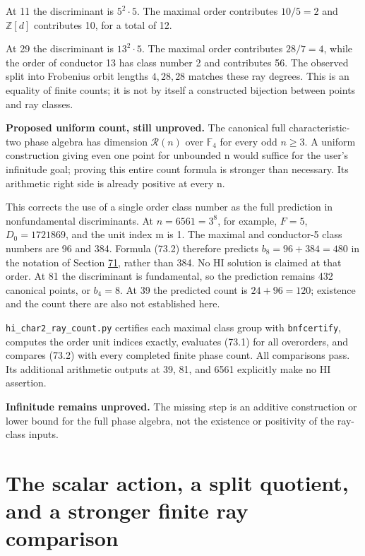 \documentclass[11pt,reqno]{amsart}
\theoremstyle{plain}
\begin{document}
At 11 the discriminant is \(5^2\cdot5\). The maximal order
contributes \(10/5=2\) and \(\mathbb Z[d]\) contributes 10,
for a total of 12.

At 29 the discriminant is \(13^2\cdot5\). The maximal order
contributes \(28/7=4\), while the order of conductor 13 has
class number 2 and contributes 56. The observed split into
Frobenius orbit lengths \(4,28,28\) matches these ray degrees.
This is an equality of finite counts; it is not by itself a
constructed bijection between points and ray classes.

\textbf{Proposed uniform count, still unproved.} The canonical full
characteristic-two phase algebra has dimension \(\mathcal R(n)\)
over \(\mathbb F_4\) for every odd \(n\ge3\).
A uniform construction giving even one point for unbounded n
would suffice for the user's infinitude goal; proving this entire
count formula is stronger than necessary. Its arithmetic right
side is already positive at every n.

This corrects the use of a single order class number as the full
prediction in nonfundamental discriminants. At \(n=6561=3^8\),
for example, \(F=5\), \(D_0=1721869\), and the unit index m
is 1. The maximal and conductor-5 class numbers are 96 and 384.
Formula (73.2) therefore predicts \(b_8=96+384=480\) in the
notation of Section \hyperref[sec:71]{71}, rather than 384. No HI solution is claimed
at that order. At 81 the discriminant is fundamental, so the
prediction remains 432 canonical points, or \(b_4=8\).
At 39 the predicted count is \(24+96=120\); existence and the
count there are also not established here.

\texttt{hi\_\allowbreak char2\_\allowbreak ray\_\allowbreak count.py} certifies each maximal class group with
\texttt{bnfcertify}, computes the order unit indices exactly, evaluates
(73.1) for all overorders, and compares (73.2) with every completed
finite phase count. All comparisons pass. Its additional arithmetic
outputs at 39, 81, and 6561 explicitly make no HI assertion.

\textbf{Infinitude remains unproved.} The missing step is an additive
construction or lower bound for the full phase algebra, not the
existence or positivity of the ray-class inputs.

\section{The scalar action, a split quotient, and a stronger finite ray comparison}\label{sec:74}
\end{document}
